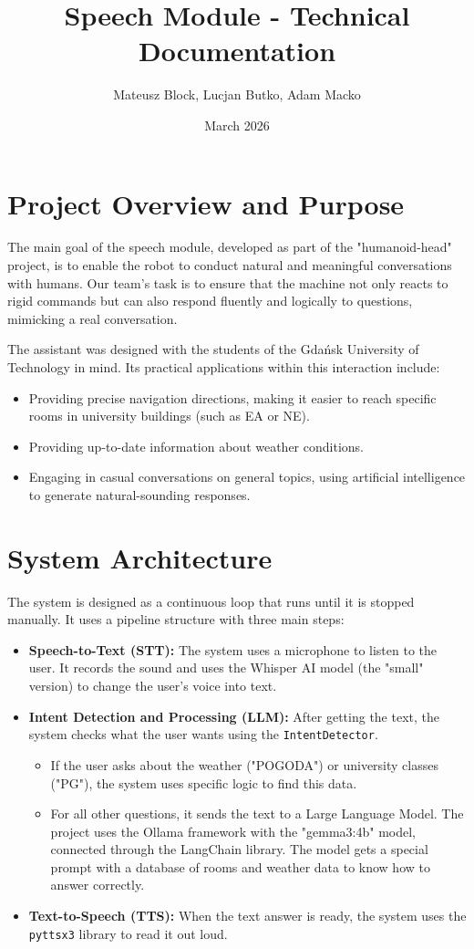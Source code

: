 \documentclass{article}
\title{Speech Module - Technical Documentation}
\author{Mateusz Block, Lucjan Butko, Adam Macko}
\date{March 2026}
\begin{document}
	
	\maketitle
	\tableofcontents
	\newpage
	
	\section{Project Overview and Purpose}
	The main goal of the speech module, developed as part of the "humanoid-head" project, is to enable the robot to conduct natural and meaningful conversations with humans. Our team's task is to ensure that the machine not only reacts to rigid commands but can also respond fluently and logically to questions, mimicking a real conversation.
	
	The assistant was designed with the students of the Gdańsk University of Technology in mind. Its practical applications within this interaction include:
	\begin{itemize}
		\item Providing precise navigation directions, making it easier to reach specific rooms in university buildings (such as EA or NE).
		\item Providing up-to-date information about weather conditions.
		\item Engaging in casual conversations on general topics, using artificial intelligence to generate natural-sounding responses.
	\end{itemize}
	
	\section{System Architecture}
	The system is designed as a continuous loop that runs until it is stopped manually. It uses a pipeline structure with three main steps:
	\begin{itemize}
		\item \textbf{Speech-to-Text (STT):} The system uses a microphone to listen to the user. It records the sound and uses the Whisper AI model (the "small" version) to change the user's voice into text.
		\item \textbf{Intent Detection and Processing (LLM):} After getting the text, the system checks what the user wants using the \texttt{IntentDetector}.
		\begin{itemize}
			\item If the user asks about the weather ("POGODA") or university classes ("PG"), the system uses specific logic to find this data.
			\item For all other questions, it sends the text to a Large Language Model. The project uses the Ollama framework with the "gemma3:4b" model, connected through the LangChain library. The model gets a special prompt with a database of rooms and weather data to know how to answer correctly.
		\end{itemize}
		\item \textbf{Text-to-Speech (TTS):} When the text answer is ready, the system uses the \texttt{pyttsx3} library to read it out loud.
	\end{itemize}
	
\end{document}
